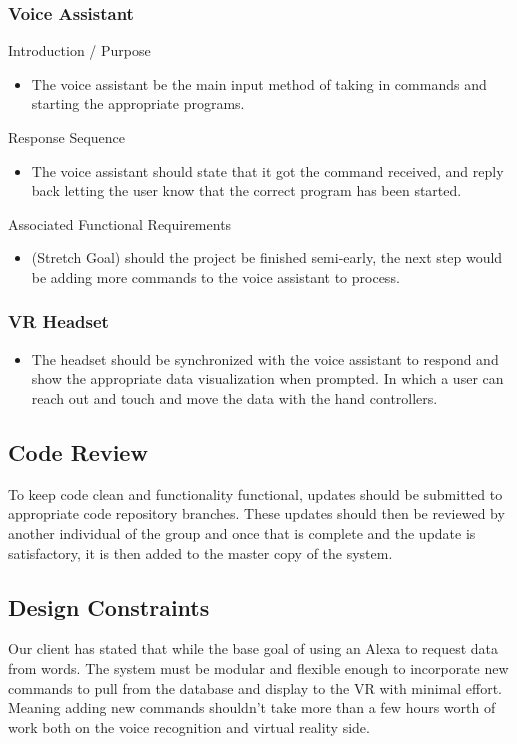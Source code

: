\documentclass[onecolumn, draftclsnofoot,10pt, compsoc]{IEEEtran}
\begin{document}
        \subsubsection{Voice Assistant}
            Introduction / Purpose
            \begin{itemize}
                \item The voice assistant be the main input method of taking in commands and starting the appropriate programs.
            \end{itemize}
            Response Sequence
            \begin{itemize}
                \item The voice assistant should state that it got the command received, and reply back letting the user know that the correct program has been started.
            \end{itemize}
            Associated Functional Requirements
            \begin{itemize}
                \item (Stretch Goal) should the project be finished semi-early, the next step would be adding more commands to the voice assistant to process.

            \end{itemize}
        \subsubsection{VR Headset}
            \begin{itemize}
                    \item The headset should be synchronized with the voice assistant to respond and show the appropriate data visualization when prompted. In which a user can reach out and touch and move the data with the hand controllers.
            \end{itemize}

        \subsection{Code Review}
            To keep code clean and functionality functional, updates should be submitted to appropriate code repository branches. These updates should then be reviewed by another individual of the group and once that is complete and the update is satisfactory, it is then added to the master copy of the system.

    \subsection{Design Constraints}
        Our client has stated that while the base goal of using an Alexa to request data from words. The system must be modular and flexible enough to incorporate new commands to pull from the database and display to the VR with minimal effort. Meaning adding new commands shouldn’t take more than a few hours worth of work both on the voice recognition and virtual reality side.
\end{document}

